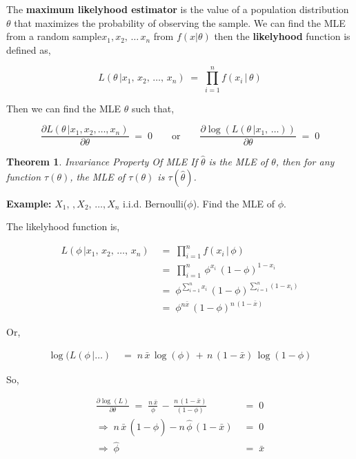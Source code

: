 \documentclass[10pt]{article}
\newtheorem{theorem}{Theorem}
\numberwithin{equation}{section}
\begin{document}
The \textbf{maximum likelyhood estimator} is the value of a population distribution $\theta$ that maximizes the probability of observing the sample.  We can find the MLE from a random sample$x_1, x_2, \, \ldots \, x_{n}$ from $f(x \vert \theta)$ then the \textbf{likelyhood} function is defined as,

$$ L(\theta  \, \vert x_1, \, x_2, \, \ldots, \, x_n)  \; = \; \prod_{i=1}^{n}f(x_{i} \, \vert \, \theta) $$


\noindent
Then we can find the MLE $\widehat{\theta}$ such that, 

$$ 
\frac{\partial L(\theta \, \vert x_1, x_2, \ldots, x_n)}{\partial \theta}  \; = \; 0 
\qquad \text{or} \qquad 
\frac{\partial \log(L(\theta \, \vert x_1, \, \ldots ))}{\partial \theta}  \; = \; 0 
$$


\noindent
\begin{theorem}{Invariance Property Of MLE} \newline
If $\widehat{\theta}$ is the MLE of $\theta$, then for any function $\tau(\theta)$, the MLE of $\tau(\theta)$ is $\tau(\widehat{\theta})$.
\end{theorem}

\vspace{2mm}

\noindent
\textbf{Example:}
$X_1, \, ,X_2, \,  \ldots, X_n$  i.i.d. Bernoulli($\phi$).  Find the MLE of $\phi$.

\vspace{1mm}

\noindent
The likelyhood function is,

\begin{align}
L(\phi  \, \vert x_1, \, x_2, \, \ldots, \, x_n)  \; &= \; \prod_{i=1}^{n}f(x_{i} \, \vert \, \phi ) \\
&= \; \prod_{i=1}^{n}\, \phi^{x_i} \, (1- \phi)^{ 1 - x_i} \\
&= \; \phi^{\sum_{i=1}^{n} x_i } \, (1- \phi)^{\sum_{i=1}^{n} (1 - x_i)} \\
&= \; \phi^{n \bar{x}} \, (1- \phi)^{n\,  (1 - \bar{x})}
\end{align}

\noindent
Or,

\begin{align}
\log(L(\phi  \, \vert \ldots )
 \; &= \; n \, \bar{x} \, \log (\phi)  \, + \, n \, (1 - \bar{x}) \, \log(1- \phi)
\end{align}

\noindent
So, 

\begin{align}
\frac{\partial \log(L)}{\partial \theta}
 \; = \; 
 \frac{n \, \bar{x} }{\phi}  \, - \,  \frac{n  \, (1-  \bar{x}) }{(1 - \phi)} 
 \;  &= \; 0\\
\Rightarrow \;  n  \, \bar{x} \, (1-  \widehat{\phi} ) -  n  \, \widehat{\phi} \, (1 - \bar{x} ) \; &= \; 0  \\
\Rightarrow \; \widehat{\phi}  \; & = \; \bar{x} 
\end{align}
\end{document}
